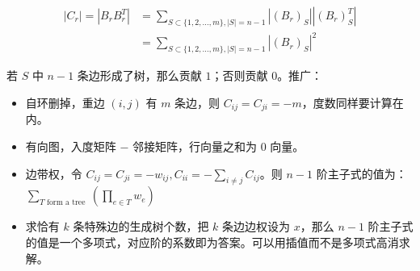 $$
\begin{aligned}
|C_r|=|B_rB_r^T|&=\sum_{S\subset \{1,2,\dots,m\},|S|=n-1}|(B_r)_S||(B_r)_S^T|\\
&=\sum_{S\subset \{1,2,\dots,m\},|S|=n-1}|(B_r)_S|^2
\end{aligned}
$$

若 $S$ 中 $n-1$ 条边形成了树，那么贡献 $1$；否则贡献 $0$。推广：

\begin{itemize}
\item 自环删掉，重边 $(i,j)$ 有 $m$ 条边，则 $C_{ij}=C_{ji}=-m$，度数同样要计算在内。
\item 有向图，入度矩阵 $-$ 邻接矩阵，行向量之和为 $0$ 向量。
\item 边带权，令 $C_{ij}=C_{ji}=-w_{ij},C_{ii}=-\sum_{i\neq j}C_{ij}$。则 $n-1$ 阶主子式的值为：$\sum_{T\text{ form a tree }}\left(\prod_{e\in T}w_e\right)$
\item 求恰有 $k$ 条特殊边的生成树个数，把 $k$ 条边边权设为 $x$，那么 $n-1$ 阶主子式的值是一个多项式，对应阶的系数即为答案。可以用插值而不是多项式高消求解。
\end{itemize}

